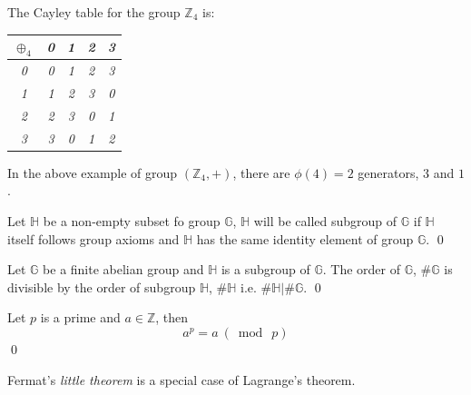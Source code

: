 \begin{example} \label{example_Cayleytable}
	The Cayley table for the group $\mathbb{Z}_4$ is:
	\begin{center}
		\begin{tabular}{c|cccc}
			$\oplus_4$&\em 0&\em 1&\em 2&\em 3       \\
			\hline
			\em 0&\em 0&\em 1&\em 2&\em 3       \\
			\em 1&\em 1&\em 2&\em 3&\em 0       \\
			\em 2&\em 2&\em 3&\em 0&\em 1       \\
			\em 3&\em 3&\em 0&\em 1&\em 2       \\
		\end{tabular}
	\end{center}
\end{example}
In the above example of group $(\mathbb{Z}_4,+)$, there are $\phi(4)=2$ generators, $3$ and $1$.

\begin{definition}
	Let $\mathbb{H}$ be  a non-empty subset  fo group $\mathbb{G}$, $\mathbb{H}$  will be called subgroup of $\mathbb{G}$ if  $\mathbb{H}$  itself follows group axioms and $\mathbb{H}$ has the same identity element of group $\mathbb{G}$. 
	\qed
\end{definition}

\begin{theorem}
	Let $\mathbb{G}$ be a finite abelian group and $\mathbb{H}$ is a subgroup of $\mathbb{G}$.  The order of $\mathbb{G}$, $\#\mathbb{G}$ is divisible by the order of subgroup $\mathbb{H}$, $\#\mathbb{H}$ i.e.   $\#\mathbb{H} | \#\mathbb{G}$.
	\qed
\end{theorem}

\begin{theorem}
	Let $p$ is a prime and $a \in \mathbb{Z}$, then $$a^p = a ~(\bmod ~p)$$
	\qed
\end{theorem}
Fermat’s \textit{little theorem} is a special case of Lagrange’s theorem.


